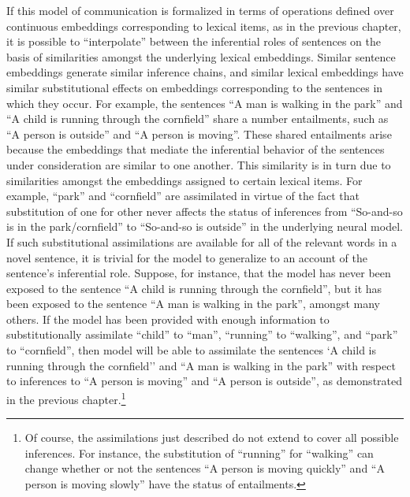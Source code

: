 If this model of communication is formalized in terms of operations defined over continuous embeddings corresponding to lexical items, as in the previous chapter, it is possible to ``interpolate'' between the inferential roles of sentences on the basis of similarities amongst the underlying lexical embeddings. Similar sentence embeddings generate similar inference chains, and similar lexical embeddings have similar substitutional effects on embeddings corresponding to the sentences in which they occur. For example, the sentences ``A man is walking in the park'' and ``A child is running through the cornfield'' share a number entailments, such as ``A person is outside'' and ``A person is moving''. These shared entailments arise because the embeddings that mediate the inferential behavior of the sentences under consideration are similar to one another. This similarity is in turn due to similarities amongst the embeddings assigned to certain lexical items. For example, ``park'' and ``cornfield'' are assimilated in virtue of the fact that substitution of one for other never affects the status of inferences from ``So-and-so is in the park/cornfield'' to ``So-and-so is outside'' in the underlying neural model. If such substitutional assimilations are available for all of the relevant words in a novel sentence, it is trivial for the model to generalize to an account of the sentence's inferential role. Suppose, for instance, that the model has never been exposed to the sentence ``A child is running through the cornfield'', but it has been exposed to the sentence ``A man is walking in the park'', amongst many others. If the model has been provided with enough information to substitutionally assimilate ``child'' to ``man'', ``running'' to ``walking'', and ``park'' to ``cornfield'', then model will be able to assimilate the sentences `A child is running through the cornfield'' and ``A man is walking in the park'' with respect to inferences to ``A person is moving'' and ``A person is outside'', as demonstrated in the previous chapter.\footnote{Of course, the assimilations just described do not extend to cover all possible inferences. For instance, the substitution of ``running'' for ``walking'' can change whether or not the sentences ``A person is moving quickly'' and ``A person is moving slowly'' have the status of entailments.}

